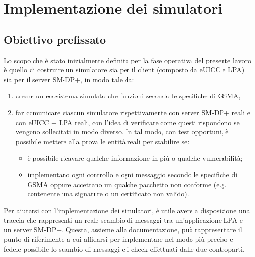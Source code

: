 \documentclass[10pt, oneside]{book}
\begin{document}
\chapter{Implementazione dei simulatori}
\section{Obiettivo prefissato}
Lo scopo che è stato inizialmente definito per la fase operativa del presente lavoro è quello di costruire un simulatore sia per il client (composto da eUICC e LPA) sia per il server SM-DP+, in modo tale da:
\begin{enumerate}
\item creare un ecosistema simulato che funzioni secondo le specifiche di GSMA;
\item far comunicare ciascun simulatore rispettivamente con server SM-DP+ reali e con eUICC + LPA reali, con l'idea di verificare come questi rispondono se vengono sollecitati in modo diverso. In tal modo, con test opportuni, è possibile mettere alla prova le entità reali per stabilire se:
\begin{itemize}[itemsep=0pt]
\item è possibile ricavare qualche informazione in più o qualche vulnerabilità;
\item implementano ogni controllo e ogni messaggio secondo le specifiche di GSMA oppure accettano un qualche pacchetto non conforme (e.g. contenente una signature o un certificato non valido).
\end{itemize}
\end{enumerate}
Per aiutarsi con l'implementazione dei simulatori, è utile avere a disposizione una traccia che rappresenti un reale scambio di messaggi tra un'applicazione LPA e un server SM-DP+. Questa, assieme alla documentazione, può rappresentare il punto di riferimento a cui affidarsi per implementare nel modo più preciso e fedele possibile lo scambio di messaggi e i check effettuati dalle due controparti.
\end{document}
